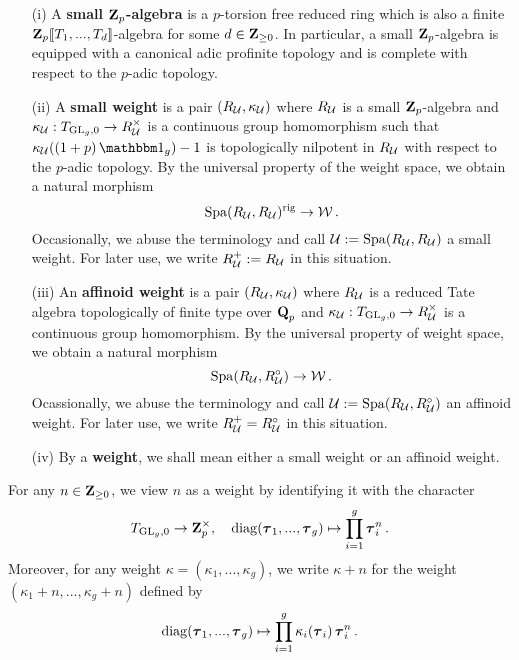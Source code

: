 \begin{Definition}\label{Definition: weights}
\begin{enumerate}
    \item[(i)] A \textbf{small $\operatorname{\mathbf{Z}}_p$-algebra} is a $p$-torsion free reduced ring which is also a finite $\operatorname{\mathbf{Z}}_p\operatorname{\![\![\!} T_1, ..., T_d\operatorname{\!]\!]}$-algebra for some $d\in \operatorname{\mathbf{Z}}_{\geq 0}$. In particular, a small $\operatorname{\mathbf{Z}}_p$-algebra is equipped with a canonical adic profinite topology and is complete with respect to the $p$-adic topology.
    \item[(ii)] A \textbf{small weight} is a pair $(R_{\operatorname{\mathcal{U}}}, \kappa_{\operatorname{\mathcal{U}}})$ where $R_{\operatorname{\mathcal{U}}}$ is a small $\operatorname{\mathbf{Z}}_p$-algebra and $\kappa_{\operatorname{\mathcal{U}}}:T_{\operatorname{GL}_g,0}\rightarrow R^{\times}_{\operatorname{\mathcal{U}}}$ is a continuous group homomorphism such that $\kappa_{\calU}((1+p)\one_g)-1$ is topologically nilpotent in $R_{\operatorname{\mathcal{U}}}$ with respect to the $p$-adic topology. By the universal property of the weight space, we obtain a natural morphism
    \[\operatorname{Spa}(R_{\operatorname{\mathcal{U}}}, R_{\operatorname{\mathcal{U}}})^{\operatorname{rig}}\rightarrow \operatorname{\mathcal{W}}.\]
Occasionally, we abuse the terminology and call $\operatorname{\mathcal{U}}:=\operatorname{Spa}(R_{\operatorname{\mathcal{U}}}, R_{\operatorname{\mathcal{U}}})$ a small weight. For later use, we write $R_{\operatorname{\mathcal{U}}}^+:=R_{\operatorname{\mathcal{U}}}$ in this situation.
    \item[(iii)] An \textbf{affinoid weight} is a pair $(R_{\operatorname{\mathcal{U}}}, \kappa_{\operatorname{\mathcal{U}}})$ where $R_{\operatorname{\mathcal{U}}}$ is a reduced Tate algebra topologically of finite type over $\operatorname{\mathbf{Q}}_p$ and $\kappa_{\operatorname{\mathcal{U}}}:T_{\operatorname{GL}_g,0}\rightarrow R^{\times}_{\operatorname{\mathcal{U}}}$ is a continuous group homomorphism. By the universal property of weight space, we obtain a natural morphism
     \[\operatorname{Spa}(R_{\operatorname{\mathcal{U}}}, R^{\circ}_{\operatorname{\mathcal{U}}})\rightarrow \operatorname{\mathcal{W}}.\]
Ocassionally, we abuse the terminology and call $\operatorname{\mathcal{U}}:=\operatorname{Spa}(R_{\operatorname{\mathcal{U}}}, R^{\circ}_{\operatorname{\mathcal{U}}})$ an affinoid weight. For later use, we write $R_{\operatorname{\mathcal{U}}}^+=R_{\operatorname{\mathcal{U}}}^{\circ}$ in this situation.
    \item[(iv)] By a \textbf{weight}, we shall mean either a small weight or an affinoid weight.
\end{enumerate}
\end{Definition}

\begin{Remark}\label{Remark: convention on weights}
\normalfont For any $n\in \operatorname{\mathbf{Z}}_{\geq 0}$, we view $n$ as a weight by identifying it with the character $$T_{\operatorname{GL}_g, 0}\rightarrow \operatorname{\mathbf{Z}}_p^\times, \quad \operatorname{diag}(\operatorname{\boldsymbol{\tau}}_1, ..., \operatorname{\boldsymbol{\tau}}_g)\mapsto \prod_{i=1}^g\operatorname{\boldsymbol{\tau}}_i^n.$$ Moreover, for any weight $\kappa=(\kappa_1, ..., \kappa_g)$, we write $\kappa+n $ for the weight $ (\kappa_1+n, ..., \kappa_g+n)$ defined by $$\operatorname{diag}(\operatorname{\boldsymbol{\tau}}_1, ..., \operatorname{\boldsymbol{\tau}}_g)\mapsto \prod_{i=1}^g\kappa_i(\operatorname{\boldsymbol{\tau}}_i)\operatorname{\boldsymbol{\tau}}_i^n.$$
\end{Remark}

